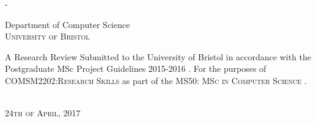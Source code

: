 \begin{titlingpage}
\begin{SingleSpace}
\begin{adjustwidth*}{\unitlength}{-\unitlength}
\begin{center}
\vspace{6mm}
{\large Department of Computer Science\\
\textsc{University of Bristol}}\\
\vspace{11mm}
\begin{minipage}{10cm}
A Research Review Submitted to the University of Bristol in accordance with the Postgraduate MSc Project Guidelines 2015-2016 \cite{UoB}. For the purposes of \textsc{COMSM2202:Research Skills} as part of the \textsc{MS50: MSc in Computer Science} .
\end{minipage}\\
\vspace{9mm}
{\large\textsc{24th of April, 2017 }}
\vspace{12mm}
\end{center}
\begin{flushright}
\end{flushright}
\end{adjustwidth*}
\end{SingleSpace}
\end{titlingpage}
